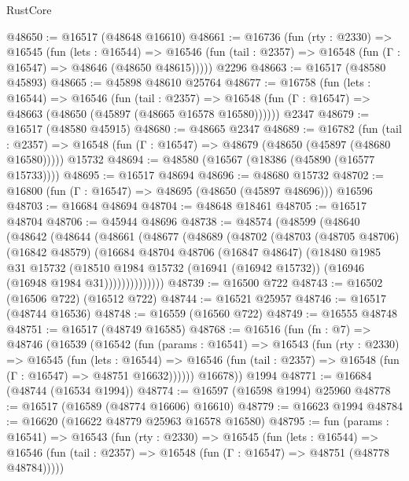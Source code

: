 \begin{lexlean}{RustCore}
\begin{coremodule}
@48650 := @16517 (@48648 @16610)
@48661 := @16736
    (fun (rty : @2330) =>
    @16545
      (fun (lets : @16544) =>
      @16546 (fun (tail : @2357) => @16548 (fun (Γ : @16547) => @48646 (@48650 @48615)))))
    @2296
@48663 := @16517 (@48580 @45893)
@48665 := @45898 @48610 @25764
@48677 := @16758
    (fun (lets : @16544) =>
    @16546
      (fun (tail : @2357) =>
      @16548 (fun (Γ : @16547) => @48663 (@48650 (@45897 (@48665 @16578 @16580))))))
    @2347
@48679 := @16517 (@48580 @45915)
@48680 := @48665 @2347
@48689 := @16782
    (fun (tail : @2357) => @16548 (fun (Γ : @16547) => @48679 (@48650 (@45897 (@48680 @16580)))))
    @15732
@48694 := @48580 (@16567 (@18386 (@45890 (@16577 @15733))))
@48695 := @16517 @48694
@48696 := @48680 @15732
@48702 := @16800 (fun (Γ : @16547) => @48695 (@48650 (@45897 @48696))) @16596
@48703 := @16684 @48694
@48704 := @48648 @18461
@48705 := @16517 @48704
@48706 := @45944 @48696
@48738 := @48574
    (@48599
      (@48640
        (@48642
          (@48644
            (@48661
              (@48677
                (@48689
                  (@48702
                    (@48703
                      (@48705 @48706)
                      (@16842 @48579)
                      (@16684
                        @48704
                        @48706
                        (@16847 @48647)
                        (@18480
                          @1985
                          @31
                          @15732
                          (@18510
                            @1984
                            @15732
                            (@16941 (@16942 @15732))
                            (@16946 (@16948 @1984 @31))))))))))))))
@48739 := @16500 @722
@48743 := @16502 (@16506 @722) (@16512 @722)
@48744 := @16521 @25957
@48746 := @16517 (@48744 @16536)
@48748 := @16559 (@16560 @722)
@48749 := @16555 @48748
@48751 := @16517 (@48749 @16585)
@48768 := @16516
    (fun (fn : @7) =>
    @48746
      (@16539
        (@16542
          (fun (params : @16541) =>
          @16543
            (fun (rty : @2330) =>
            @16545
              (fun (lets : @16544) =>
              @16546 (fun (tail : @2357) => @16548 (fun (Γ : @16547) => @48751 @16632))))))
        @16678))
    @1994
@48771 := @16684 (@48744 (@16534 @1994))
@48774 := @16597 (@16598 @1994) @25960
@48778 := @16517 (@16589 (@48774 @16606) @16610)
@48779 := @16623 @1994
@48784 := @16620 (@16622 @48779 @25963 @16578 @16580)
@48795 := fun (params : @16541) =>
  @16543
    (fun (rty : @2330) =>
    @16545
      (fun (lets : @16544) =>
      @16546 (fun (tail : @2357) => @16548 (fun (Γ : @16547) => @48751 (@48778 @48784)))))

\end{coremodule}
\end{lexlean}
